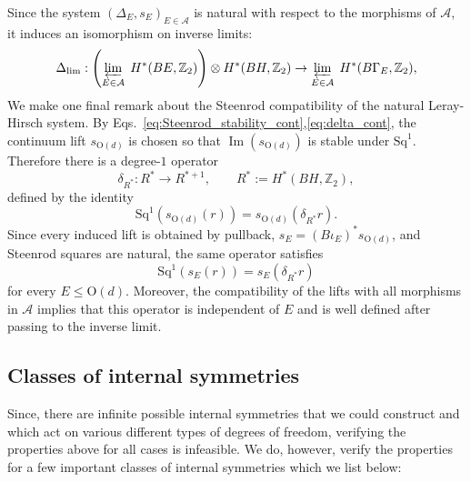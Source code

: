 \documentclass[aps,prx,reprint,superscriptaddress,twocolumn,amsmath,amssymb,amsfonts, nofootinbib]{revtex4-2}
\newcommand{\Z}{\mathbb{Z}}
\theoremstyle{apsstyle}
\begin{document}
Since the system $(\Delta_{E}, s_{E})_{E\in \mathcal{A}}$ is natural with respect to the morphisms of $\mathcal{A}$, it induces an isomorphism on inverse limits:
\begin{equation}
    \label{eq:internal_lim_mod2}
    \Delta_{\lim}: \left( \varprojlim_{E\in \mathcal{A}}\; H^{*}(BE, \Z_{2})\right)\otimes H^{*}(BH, \Z_{2}) \to \varprojlim_{E\in \mathcal{A}}\; H^{*}(B\Gamma_{E}, \Z_{2}),
\end{equation}
\noindent We make one final remark about the Steenrod compatibility of the natural Leray-Hirsch system. By Eqs.~\ref{eq:Steenrod_stability_cont},\ref{eq:delta_cont}, the continuum lift $s_{\mathrm{O}(d)}$ is chosen so that $\operatorname{Im}(s_{\mathrm{O}(d)})$ is stable under $\mathrm{Sq}^{1}$. Therefore there is a degree-$1$ operator
\begin{equation}
\delta_{R^{*}}:R^{*}\to R^{*+1},
\qquad R^{*}:=H^{*}(BH,\mathbb Z_{2}),
\end{equation}
defined by the identity
\begin{equation}
\mathrm{Sq}^{1}(s_{\mathrm{O}(d)}(r))=s_{\mathrm{O}(d)}(\delta_{R^{*}}r).
\end{equation}
Since every induced lift is obtained by pullback, $s_E=(B\iota_E)^*s_{\mathrm{O}(d)}$, and Steenrod squares are natural, the same operator satisfies
\begin{equation}
\label{eq:indep_E}
\mathrm{Sq}^{1}(s_E(r))=s_E(\delta_{R^{*}}r)
\end{equation}
for every $E\le \mathrm{O}(d)$. Moreover, the compatibility of the lifts with all morphisms in $\mathcal A$ implies that this operator is independent of $E$ and is well defined after passing to the inverse limit.


\subsection{Classes of internal symmetries}
\label{app:class_internal}

Since, there are infinite possible internal symmetries that we could construct and which act on various different types of degrees of freedom, verifying the properties above for all cases is infeasible. We do, however, verify the properties for a few important classes of internal symmetries which we list below:
\bigskip 
\end{document}
